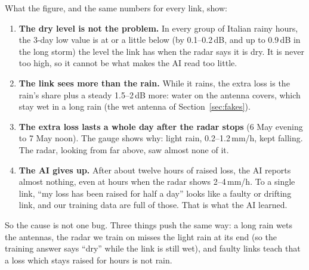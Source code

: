 What the figure, and the same numbers for every link, show:
\begin{enumerate}
\item \textbf{The dry level is not the problem.} In every group of Italian rainy hours, the 3-day low value is at or a little below (by
0.1--0.2\,dB, and up to 0.9\,dB in the long storm) the level the link has when the radar says it is dry. It is never too
high, so it cannot be what makes the AI read too little.
\item \textbf{The link sees more than the rain.} While it rains, the extra loss is the rain's share plus a steady 1.5--2\,dB
more: water on the antenna covers, which stay wet in a long rain (the wet antenna of Section~\ref{sec:fakes}).
\item \textbf{The extra loss lasts a whole day after the radar stops} (6 May evening to 7 May noon). The gauge shows why:
light rain, 0.2--1.2\,mm/h, kept falling. The radar, looking from far above, saw almost none of it.
\item \textbf{The AI gives up.} After about twelve hours of raised loss, the AI reports almost nothing, even at hours when
the radar shows 2--4\,mm/h. To a single link, ``my loss has been raised for half a day'' looks like a faulty or drifting link, and
our training data are full of those. That is what the AI learned.
\end{enumerate}
So the cause is not one bug. Three things push the same way: a long rain wets the antennas, the radar we train on misses the
light rain at its end (so the training answer says ``dry'' while the link is still wet), and faulty links teach that a
loss which stays raised for hours is not rain.

